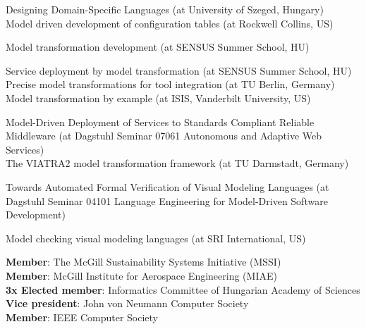 \documentclass{xetexCV}
\begin{document}
Designing Domain-Specific Languages (at University of Szeged, Hungary)
 \\

Model driven  development of configuration tables (at Rockwell Collins, US)

Model transformation development (at SENSUS Summer School, HU)

Service deployment by model transformation (at SENSUS Summer School, HU)
\\

Precise model transformations for tool integration (at TU Berlin, Germany)
 \\

Model transformation by example (at ISIS, Vanderbilt University, US)

Model-Driven Deployment of Services to Standards Compliant Reliable
Middleware (at Dagstuhl Seminar 07061 Autonomous and Adaptive Web Services)
\\

The VIATRA2 model transformation framework (at TU Darmstadt, Germany)

Towards Automated Formal Verification of Visual Modeling Languages
(at Dagstuhl Seminar 04101 Language Engineering for Model-Driven Software Development) 

Model checking visual modeling languages (at SRI International, US) %

\textbf{Member}:   The McGill Sustainability Systems Initiative (MSSI)\\
\textbf{Member}:   McGill Institute for Aerospace Engineering (MIAE)\\
\textbf{3x Elected member}:  Informatics Committee of Hungarian Academy of Sciences \\
\textbf{Vice president}:  John von Neumann Computer Society \\
\textbf{Member}: IEEE Computer Society 

\newpage

\end{document}
